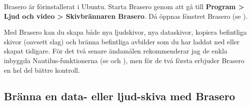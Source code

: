 \documentclass[a4paper,final]{memoir} %
\begin{document}
Brasero är förinstallerat i Ubuntu. Starta Brasero genom att gå till \textbf{Program \textgreater{} Ljud och video \textgreater{} Skivbrännaren Brasero}. Då öppnas fönstret Brasero (se ).


Med Brasero kan du skapa både nya ljudskivor, nya dataskivor, kopiera befintliga skivor (oavsett slag) och bränna befintliga avbilder som du har laddat ned eller skapat tidigare. För det två senare ändamålen rekommenderar jag de enkla inbyggda Nautilus-funktionerna (se  och ), men för de två första erbjuder Brasero en hel del bättre kontroll.

\subsection{Bränna en data- eller ljud-skiva med Brasero}\label{brasero-burn-data}
\end{document}
